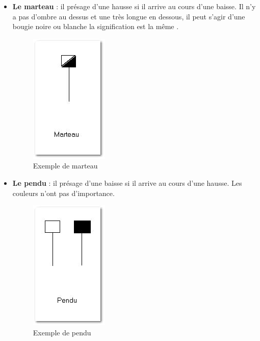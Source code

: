 \begin{itemize}
\item \textbf{Le marteau} : il présage d’une hausse si il arrive au cours d’une baisse. Il n’y a pas d’ombre au dessus et une très longue en dessous, il peut s’agir d’une bougie noire ou blanche la signification est la même .
\begin{figure}[H]
  \center
  \includegraphics[scale=0.5]{../graph/chandelier3.png}
  \caption{Exemple de marteau}
\end{figure} 

\item \textbf{Le pendu} : il présage d’une baisse si il arrive au cours d’une hausse. Les couleurs n’ont pas d’importance. 
 \begin{figure}[H]
  \center
  \includegraphics[scale=0.5]{../graph/chandelier4.png}
  \caption{Exemple de pendu}
\end{figure} 


\end{itemize}
